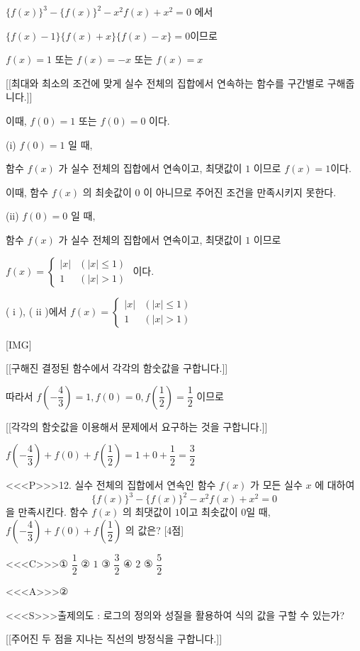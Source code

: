 \documentclass{oblivoir}
\begin{document}
$\{f(x)\}^{3}-\{f(x)\}^{2}-x^{2} f(x)+x^{2}=0$ 에서

$\{f(x)-1\}\{f(x)+x\}\{f(x)-x\}=0$이므로

$f(x)=1$ 또는 $f(x)=-x$ 또는 $f(x)=x$

[[최대와 최소의 조건에 맞게 실수 전체의 집합에서 연속하는 함수를 구간별로 구해줍니다.]]

이때, $f(0)=1$ 또는 $f(0)=0$ 이다.

(i) $f(0)=1$ 일 때,

함수 $f(x)$ 가 실수 전체의 집합에서 연속이고, 최댓값이 $1$ 이므로 $f(x)=1$이다.

이때, 함수 $f(x)$ 의 최솟값이 $0$ 이 아니므로 주어진 조건을 만족시키지 못한다.

(ii) $f(0)=0$ 일 때,

함수 $f(x)$ 가 실수 전체의 집합에서 연속이고, 최댓값이 $1$ 이므로

$f(x)=\begin{cases}|x| & (|x| \leq 1) \\ 1 & (|x|>1) \end{cases}$
이다.

( i ), ( ii )에서 $f(x)=\begin{cases} |x| & (|x| \leq 1) \\ 1 & (|x|>1)\end{cases}$

[IMG]

[[구해진 결정된 함수에서 각각의 함숫값을 구합니다.]]

따라서 $f\left(-\dfrac{4}{3}\right)=1, f(0)=0, f\left(\dfrac{1}{2}\right)=\dfrac{1}{2}$ 이므로

[[각각의 함숫값을 이용해서 문제에서 요구하는 것을 구합니다.]]

$f\left(-\dfrac{4}{3}\right)+f(0)+f\left(\dfrac{1}{2}\right)=1+0+\dfrac{1}{2}=\dfrac{3}{2}$

<<<P>>>12. 실수 전체의 집합에서 연속인 함수 $f(x)$ 가 모든 실수 $x$ 에 대하여
$$
\{f(x)\}^{3}-\{f(x)\}^{2}-x^{2} f(x)+x^{2}=0
$$
을 만족시킨다. 함수 $f(x)$ 의 최댓값이 $1$이고 최솟값이 $0$일 때, $f\left(-\dfrac{4}{3}\right)+f(0)+f\left(\dfrac{1}{2}\right)$ 의 값은? [4점]

<<<C>>>① $\dfrac{1}{2}$
② $1$
③ $\dfrac{3}{2}$
④ $2$
⑤ $\dfrac{5}{2}$

<<<A>>>②

<<<S>>>출제의도 : 로그의 정의와 성질을 활용하여 식의 값을 구할 수 있는가?

[[주어진 두 점을 지나는 직선의 방정식을 구합니다.]]
\end{document}
